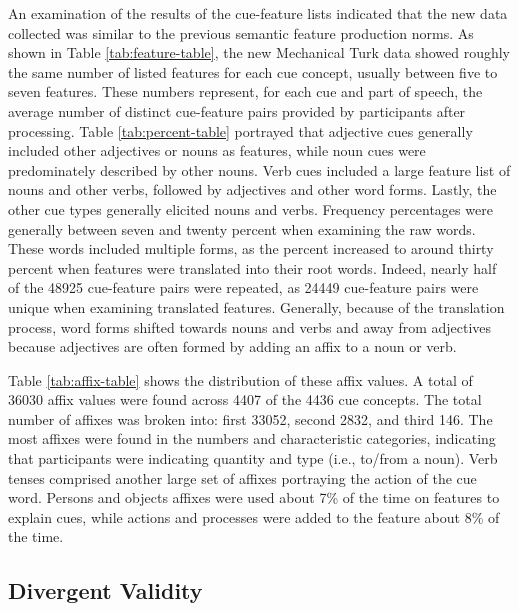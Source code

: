 \documentclass[english,,man]{apa6}
\begin{document}
An examination of the results of the cue-feature lists indicated that the new data collected was similar to the previous semantic feature production norms. As shown in Table \ref{tab:feature-table}, the new Mechanical Turk data showed roughly the same number of listed features for each cue concept, usually between five to seven features. These numbers represent, for each cue and part of speech, the average number of distinct cue-feature pairs provided by participants after processing. Table \ref{tab:percent-table} portrayed that adjective cues generally included other adjectives or nouns as features, while noun cues were predominately described by other nouns. Verb cues included a large feature list of nouns and other verbs, followed by adjectives and other word forms. Lastly, the other cue types generally elicited nouns and verbs. Frequency percentages were generally between seven and twenty percent when examining the raw words. These words included multiple forms, as the percent increased to around thirty percent when features were translated into their root words. Indeed, nearly half of the 48925 cue-feature pairs were repeated, as 24449 cue-feature pairs were unique when examining translated features. Generally, because of the translation process, word forms shifted towards nouns and verbs and away from adjectives because adjectives are often formed by adding an affix to a noun or verb.

Table \ref{tab:affix-table} shows the distribution of these affix values. A total of 36030 affix values were found across 4407 of the 4436 cue concepts. The total number of affixes was broken into: first 33052, second 2832, and third 146. The most affixes were found in the numbers and characteristic categories, indicating that participants were indicating quantity and type (i.e., to/from a noun). Verb tenses comprised another large set of affixes portraying the action of the cue word. Persons and objects affixes were used about 7\% of the time on features to explain cues, while actions and processes were added to the feature about 8\% of the time.

\hypertarget{divergent-validity}{%
\subsection{Divergent Validity}\label{divergent-validity}}
\end{document}
